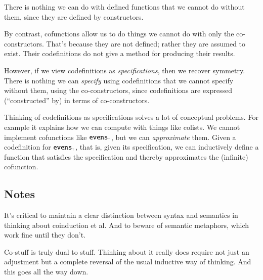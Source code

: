 There is nothing we can do with defined functions that we cannot do
without them, since they are defined by constructors.

By contrast, cofunctions allow us to do things we cannot do with only
the co-constructors. That's because they are not defined; rather they
are assumed to exist. Their codefinitions do not give a method for
producing their results.

However, if we view codefinitions as \textit{specifications}, then we
recover symmetry. There is nothing we can \textit{specify} using
codefinitions that we cannot specify without them, using the
co-constructors, since codefinitions are expressed (``constructed''
by) in terms of co-constructors.

Thinking of codefinitions as specifications solves a lot of conceptual
problems. For example it explains how we can compute with things like
colists. We cannot implement cofunctions like \(\texttt{\upshape evens}_{\scriptscriptstyle\top}\), but
we can \textit{approximate} them. Given a codefinition for
\(\texttt{\upshape evens}_{\scriptscriptstyle\top}\), that is, given its specification, we can
inductively define a function that satisfies the specification and
thereby approximates the (infinite) cofunction.

\subsection{Notes}

It's critical to maintain a clear distinction between syntax and
semantics in thinking about coinduction et al. And to beware of
semantic metaphors, which work fine until they don't.

Co-stuff is truly dual to stuff. Thinking about it really does require
not just an adjustment but a complete reversal of the usual inductive
way of thinking.  And this goes all the way down.


